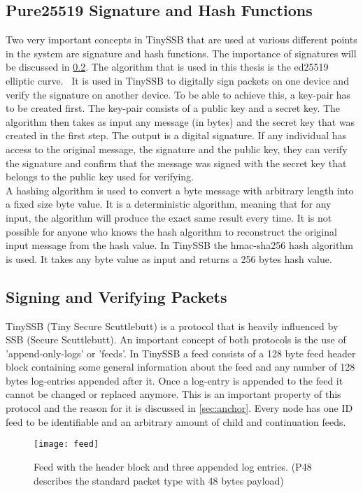 \subsection{Pure25519 Signature and Hash Functions}
Two very important concepts in TinySSB that are used at various different points in the system are signature and hash functions. The importance of signatures will be discussed in \cref{sec:signing}. The algorithm that is used in this thesis is the ed25519 elliptic curve.~\cite{9519456} It is used in TinySSB to digitally sign packets on one device and verify the signature on another device. To be able to achieve this, a key-pair has to be created first. The key-pair consists of a public key and a secret key. The algorithm then takes as input any message (in bytes) and the secret key that was created in the first step. The output is a digital signature. If any individual has access to the original message, the signature and the public key, they can verify the signature and confirm that the message was signed with the secret key that belongs to the public key used for verifying. \\
A hashing algorithm is used to convert a byte message with arbitrary length into a fixed size byte value. It is a deterministic algorithm, meaning that for any input, the algorithm will produce the exact same result every time. It is not possible for anyone who knows the hash algorithm to reconstruct the original input message from the hash value. 
In TinySSB the hmac-sha256 hash algorithm is used. It takes any byte value as input and returns a 256 bytes hash value.~\cite{Kelly2007UsingHH}

\subsection{Signing and Verifying Packets}
\label{sec:signing}
TinySSB (Tiny Secure Scuttlebutt) is a protocol that is heavily influenced by SSB (Secure Scuttlebutt). An important concept of both protocols is the use of 'append-only-logs' or 'feeds'. In TinySSB a feed consists of a 128 byte feed header block containing some general information about the feed and any number of 128 bytes log-entries appended after it. Once a log-entry is appended to the feed it cannot be changed or replaced anymore. This is an important property of this protocol and the reason for it is discussed in \cref{sec:anchor}. Every node has one ID feed to be identifiable and an arbitrary amount of child and continuation feeds.
\begin{figure}
\centering
\texttt{[image: feed]}
\caption{Feed with the header block and three appended log entries. (P48 describes the standard packet type with 48 bytes payload)}
\label{fig:feed}
\end{figure}

